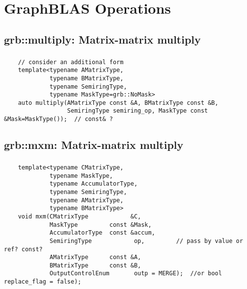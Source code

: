
\chapter{GraphBLAS Operations}

\section{{\sf grb::multiply}: Matrix-matrix multiply}

\paragraph{\syntax}

\begin{verbatim}
    // consider an additional form
    template<typename AMatrixType,
             typename BMatrixType,
             typename SemiringType,
             typename MaskType=grb::NoMask>
    auto multiply(AMatrixType const &A, BMatrixType const &B,
                  SemiringType semiring_op, MaskType const &Mask=MaskType());  // const& ?
\end{verbatim}

\section{{\sf grb::mxm}: Matrix-matrix multiply}

\paragraph{\syntax}

\begin{verbatim}
    template<typename CMatrixType,
             typename MaskType,
             typename AccumulatorType,
             typename SemiringType,
             typename AMatrixType,
             typename BMatrixType>
    void mxm(CMatrixType            &C,
             MaskType         const &Mask,
             AccumulatorType  const &accum,
             SemiringType            op,         // pass by value or ref? const?
             AMatrixType      const &A,
             BMatrixType      const &B,
             OutputControlEnum       outp = MERGE);  //or bool replace_flag = false);
\end{verbatim}


